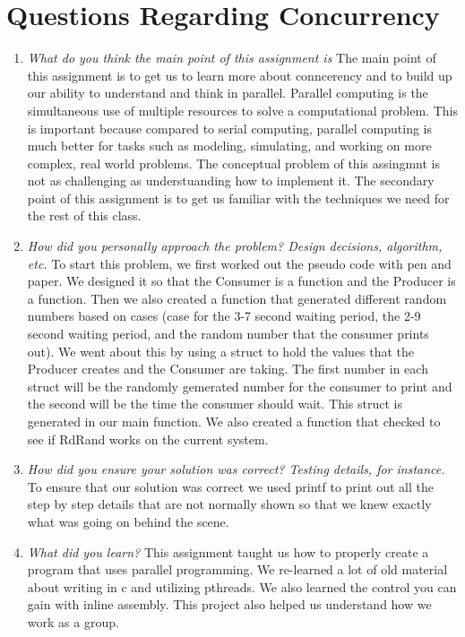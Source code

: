 \section{Questions Regarding Concurrency}
\begin{enumerate}

   \item \textit{What do you think the main point of this assignment is} The main point of this assignment is to get us to learn more about conncerency and to build up our ability to understand and think in parallel. Parallel computing is the simultaneous use of multiple resources to solve a computational problem. This is important because compared to serial computing, parallel computing is much better for tasks such as modeling, simulating, and working on more complex, real world problems. The conceptual problem of this assingmnt is not as challenging as understuanding how to implement it. The secondary point of this assignment is to get us familiar with the techniques we need for the rest of this class. 

   \item \textit{How did you personally approach the problem? Design decisions, algorithm, etc.} To start this problem, we first worked out the pseudo code with pen and paper.  We designed it so that the Consumer is a function and the Producer is a function. Then we also created a function that generated different random numbers based on cases\cite{1} \cite{3} (case for the 3-7 second waiting period, the 2-9 second waiting period, and the random number that the consumer prints out). We went about this by using a struct to hold the values that the Producer creates and the Consumer are taking. The first number in each struct will be the randomly gemerated number for the consumer to print and the second will be the time the consumer should wait. This struct is generated in our main function. We also created a function that checked to see if RdRand works on the current system.\cite{2}   

   \item \textit{How did you ensure your solution was correct? Testing details, for instance.} To ensure that our solution was correct we used printf to print out all the step by step details that are not normally shown so that we knew exactly what was going on behind the scene.

   \item \textit{What did you learn?} This assignment taught us how to properly create a program that uses parallel programming. We re-learned a lot of old material about writing in c and utilizing pthreads. We also learned the control you can gain with inline assembly. This project also helped us understand how we work as a group.  

\end{enumerate}

